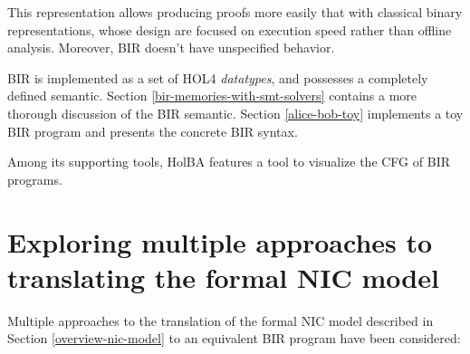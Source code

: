 \documentclass{kththesis}
\begin{document}
{This representation allows producing proofs more easily that with classical binary representations, whose design are focused on execution speed rather than offline analysis. Moreover, BIR doesn't have unspecified behavior.

BIR is implemented as a set of HOL4 \textit{datatypes}, and possesses a completely defined semantic. Section \ref{bir-memories-with-smt-solvers} contains a more thorough discussion of the BIR semantic. Section \ref{alice-bob-toy} implements a toy BIR program and presents the concrete BIR syntax.

Among its supporting tools, HolBA features a tool to visualize the \gls{CFG} of BIR programs.

\section{Exploring multiple approaches to translating the formal NIC model}

Multiple approaches to the translation of the formal NIC model described in Section \ref{overview-nic-model} to an equivalent BIR program have been considered:

}
\end{document}
